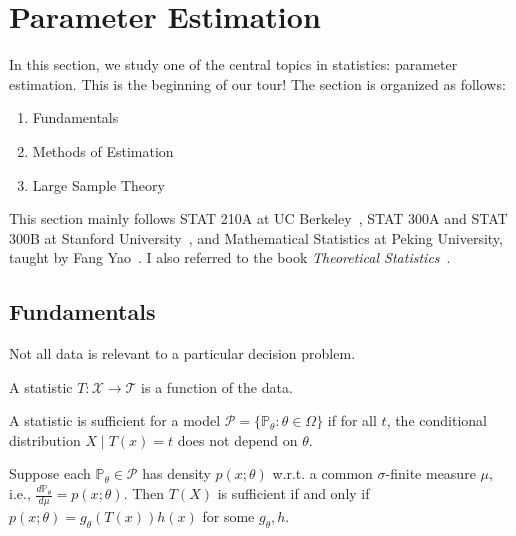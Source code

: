\newpage
\section{Parameter Estimation}
In this section, we study one of the central topics in statistics: parameter estimation. This is the beginning of our tour! 
The section is organized as follows: 
\begin{enumerate}
    \item Fundamentals
    \item Methods of Estimation
    \item Large Sample Theory
\end{enumerate}

This section mainly follows STAT 210A at UC Berkeley~\cite{berkeleyStat210A}, STAT 300A and STAT 300B at Stanford University~\cite{mackeyStanfordStats300A,duchiStanfordStats300B}, and Mathematical Statistics at Peking University, taught by Fang Yao~\cite{yaoPkuMathematicalStatistics}. I also referred to the book \emph{Theoretical Statistics}~\cite{cox1979theoretical}.

\subsection{Fundamentals}
Not all data is relevant to a particular decision problem.
\begin{defn}[Statistic]
A statistic $T : \mathcal{X} \to \mathcal{T}$ is a function of the data.
\end{defn}

\begin{defn}
A statistic is sufficient for a model $\mathcal{P} = \{\mathbb{P}_\theta : \theta \in \Omega\}$ if for all $t$, the conditional distribution $X \mid T(x) = t$ does not depend on $\theta$.
\end{defn}

\begin{thm}
Suppose each $\mathbb{P}_\theta \in \mathcal{P}$ has density $p(x; \theta)$ w.r.t. a common $\sigma$-finite measure $\mu$, i.e., $\frac{d\mathbb{P}_\theta}{d\mu} = p(x; \theta)$. Then $T(X)$ is sufficient if and only if $p(x; \theta) = g_\theta(T(x)) h(x)$ for some $g_\theta, h$.
\end{thm}

